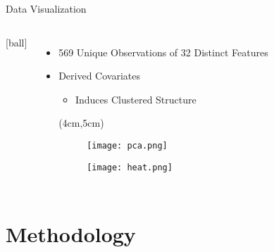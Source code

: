 \documentclass[12pt]{beamer}
\begin{document}

\begin{frame}{Data Visualization}

 \begin{columns}
\vspace{-3.7cm} 
[ball]
  \begin{itemize}
    \item 569 Unique Observations of 32 Distinct Features
    \item Derived Covariates
  	\begin{itemize}
		\item Induces Clustered Structure
	\end{itemize}
  \begin{textblock*}{2cm}(4cm,5cm)
\begin{figure}[htbp]
\begin{minipage}{.5\textwidth}
	\hspace*{-2.4cm}\texttt{[image: pca.png]}
\end{minipage}%

\end{figure}
\begin{figure}[htbp]
\begin{minipage}{.5\textwidth}
	\vspace{-4.5cm}\hspace*{3.8cm}\texttt{[image: heat.png]}
\end{minipage}%

\end{figure}






\end{textblock*}
  
  \end{itemize}
\end{columns}



\end{frame}




\section{Methodology}
\end{document}
